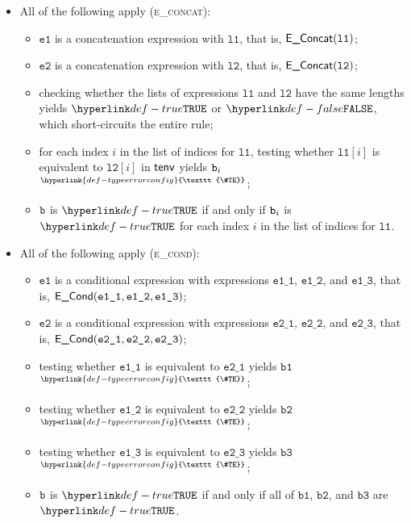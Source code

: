 \documentclass{book}
\newcommand\TypeErrorConfig[0]{\hyperlink{def-typeerrorconfig}{\texttt{\#TE}}}
\newcommand\ProseOrTypeError[0]{\hyperlink{def-proseortypeerror}{$^{\TypeErrorConfig}$}}
\newcommand\veone[0]{\texttt{e1}}
\newcommand\vetwo[0]{\texttt{e2}}
\newcommand\veoneone[0]{\texttt{e1\_1}}
\newcommand\veonetwo[0]{\texttt{e1\_2}}
\newcommand\veonethree[0]{\texttt{e1\_3}}
\newcommand\vetwoone[0]{\texttt{e2\_1}}
\newcommand\vetwotwo[0]{\texttt{e2\_2}}
\newcommand\vetwothree[0]{\texttt{e2\_3}}
\newcommand\vbone[0]{\texttt{b1}}
\newcommand\vbtwo[0]{\texttt{b2}}
\newcommand\vbthree[0]{\texttt{b3}}
\newcommand\vlone[0]{\texttt{l1}}
\newcommand\vltwo[0]{\texttt{l2}}
\begin{document}
\begin{itemize}
  \item All of the following apply (\textsc{e\_concat}):
  \begin{itemize}
    \item $\veone$ is a concatenation expression with $\vlone$, that is, $\EConcat(\vlone)$;
    \item $\vetwo$ is a concatenation expression with $\vltwo$, that is, $\EConcat(\vltwo)$;
    \item checking whether the lists of expressions $\vlone$ and $\vltwo$ have the same lengths yields
          $\True$ or $\False$, which short-circuits the entire rule;
    \item for each index $i$ in the list of indices for $\vlone$, testing whether $\vlone[i]$ is equivalent to $\vltwo[i]$
          in $\textsf{tenv}$ yields $\texttt{b}_i$ \ProseOrTypeError;
    \item $\texttt{b}$ is $\True$ if and only if $\texttt{b}_i$ is $\True$ for each index $i$ in the list of indices for $\vlone$.
  \end{itemize}

  \item All of the following apply (\textsc{e\_cond}):
  \begin{itemize}
    \item $\veone$ is a conditional expression with expressions $\veoneone$, $\veonetwo$, and $\veonethree$,
          that is, $\ECond(\veoneone, \veonetwo, \veonethree)$;
    \item $\vetwo$ is a conditional expression with expressions $\vetwoone$, $\vetwotwo$, and $\vetwothree$,
          that is, $\ECond(\vetwoone, \vetwotwo, \vetwothree)$;
    \item testing whether $\veoneone$ is equivalent to $\vetwoone$ yields $\vbone$ \ProseOrTypeError;
    \item testing whether $\veonetwo$ is equivalent to $\vetwotwo$ yields $\vbtwo$ \ProseOrTypeError;
    \item testing whether $\veonethree$ is equivalent to $\vetwothree$ yields $\vbthree$ \ProseOrTypeError;
    \item $\texttt{b}$ is $\True$ if and only if all of $\vbone$, $\vbtwo$, and $\vbthree$ are $\True$.
  \end{itemize}


\end{itemize}
\end{document}

